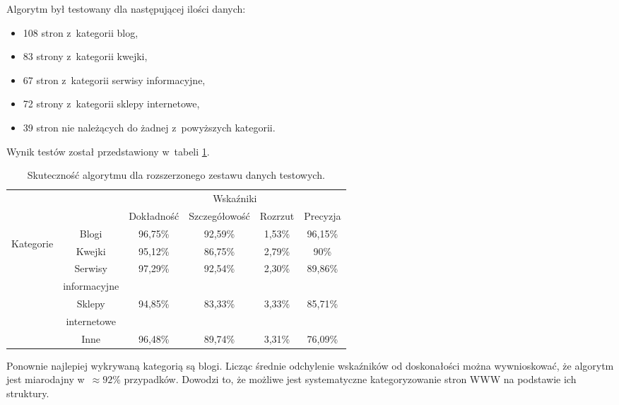 \documentclass[a4paper,11pt]{article}
\begin{document}
Algorytm był testowany dla następującej ilości danych:

\begin{itemize}
    \item 108 stron z~kategorii blog,
    \item 83 strony z~kategorii kwejki,
    \item 67 stron z~kategorii serwisy informacyjne,
    \item 72 strony z~kategorii sklepy internetowe,
    \item 39 stron nie należących do żadnej z~powyższych kategorii.
\end{itemize}

Wynik testów został przedstawiony w~tabeli \ref{tab:full_set_accuracy}.

\begin{table}[ht!]
\centering
    \begin{tabular}{| c | c | c | c | c | c |}
        \hline
        \multicolumn{2}{|c|}{} & \multicolumn{4}{c|}{Wskaźniki} \\
        \cline{3-6}
        \multicolumn{2}{|c|}{} & Dokładność & Szczegółowość & Rozrzut & Precyzja \\
        \hline
        \multirow{7}{*}{\begin{sideways}Kategorie \end{sideways}} & Blogi & 96,75\% & 92,59\% & 1,53\% & 96,15\% \\
        \cline{2-6}
        & Kwejki & 95,12\% & 86,75\% & 2,79\% & 90\% \\
        \cline{2-6}
        & Serwisy & \multirow{2}{*}{97,29\%} & \multirow{2}{*}{92,54\%} & \multirow{2}{*}{2,30\%} & \multirow{2}{*}{89,86\%} \\
        & informacyjne & & & & \\
        \cline{2-6}
        & Sklepy & \multirow{2}{*}{94,85\%} & \multirow{2}{*}{83,33\%} & \multirow{2}{*}{3,33\%} & \multirow{2}{*}{85,71\%} \\
        & internetowe & & & & \\
        \cline{2-6}
        & Inne & 96,48\% & 89,74\% & 3,31\% & 76,09\% \\
        \hline
    \end{tabular}
    \caption{Skuteczność algorytmu dla rozszerzonego zestawu danych testowych.}
    \label{tab:full_set_accuracy}
\end{table}

Ponownie najlepiej wykrywaną kategorią są blogi. Licząc średnie odchylenie wskaźników od doskonałości można wywnioskować, że algorytm jest miarodajny w~$\approx 92\%$ przypadków. Dowodzi to, że możliwe jest systematyczne kategoryzowanie stron WWW na podstawie ich struktury.
\end{document}
